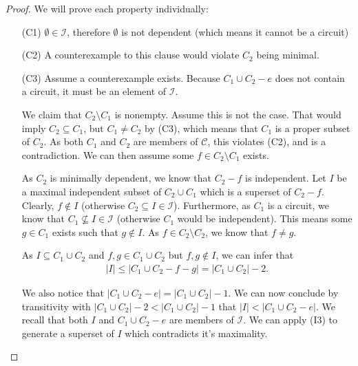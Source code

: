 \begin{proof} We will prove each property individually:
  
\begin{enumerate}
    \item[(C1)] $\emptyset \in \mathcal I$, therefore $\emptyset$ is not dependent (which means it cannot be a circuit)
    \item[(C2)] A counterexample to this clause would violate $C _2$ being minimal.
    \item[(C3)] Assume a counterexample exists. Because $C _1 \cup C _2 - e$ does not contain a circuit, it must be an element of $\mathcal I$. 

        We claim that $C _2 \setminus C _1$ is nonempty. Assume this is not the case. That would imply $C _2 \subseteq C _1$, but $C _1 \neq C _2 $ by (C3), which means that $C _1 $ is a proper subset of $C _2$. As both $C _1 $ and $C _2 $ are members of $\mathcal C$, this violates (C2), and is a contradiction. We can then assume some $f \in C _2 \setminus C _1 $ exists.

        As $C _2$ is minimally dependent, we know that $C _2 - f$ is independent. Let $I$ be a maximal independent subset of $C _2 \cup C _1$ which is a superset of $C _2 - f$. Clearly, $f \not\in I$ (otherwise $C _2 \subseteq I \in \mathcal I$). Furthermore, as $C _1 $ is a circuit, we know that $C _1 \not \subseteq I \in \mathcal I$ (otherwise $C _1$ would be independent). This means some $g \in C _1$ exists such that $g \not\in I$. As $f \in C _2  \setminus  C _2$, we know that $f \neq g$.

        As $I \subseteq C _1 \cup C _2$ and $f, g \in C _1 \cup C _2$ but $f, g \not\in I$, we can infer that 
        \begin{align*}
        |I| \leq |C _1 \cup C _2 - f - g| = |C _1 \cup C _2| - 2.
        \end{align*}

        We also notice that $|C _1 \cup C _2 - e| = |C _1 \cup C _2 | - 1$. We can now conclude by transitivity with $|C _1 \cup C _2 | - 2 < |C _1 \cup C _2 | - 1$ that $|I| < |C _1 \cup C _2 - e|$. We recall that both $I$ and $C _1 \cup C _2 - e$ are members of $\mathcal I$. We can apply (I3) to generate a superset of $I$ which contradicts it's maximality.
\end{enumerate}
\end{proof}

